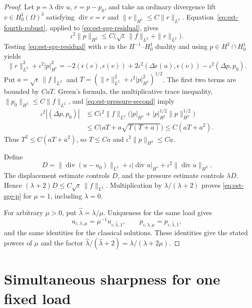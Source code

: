 \documentclass[11pt,a4paper]{article}
\theoremstyle{remark}
\numberwithin{equation}{section}
\begin{document}
\begin{proof}
Let $p=\lambda\operatorname{div}u$, $r=p-p_0$, and take an ordinary
divergence lift $v\in H_0^1(\Omega)^3$ satisfying
$\operatorname{div}v=r$ and $\|v\|_{H^1}\le C\|r\|_{L^2}$.
Equation~\eqref{eq:est-fourth-robust}, applied to
\eqref{eq:est-sge-residual}, gives
\begin{equation}\label{eq:est-pressure-second}
 \iota^2\|p\|_{H^2}
 \le C\bigl(\sqrt\iota\,\|f\|_{L^2}+\|r\|_{L^2}\bigr).
\end{equation}
Testing \eqref{eq:est-sge-residual} with $v$ in the $H^{-1}$--$H_0^1$
duality and using $p\in H^2\cap H_0^1$ yields
\begin{equation}\label{eq:est-pressure-identity}
 \|r\|_{L^2}^2+\iota^2|p|_{H^1}^2
 =-2(\epsilon(e),\epsilon(v))
       +2\iota^2(\Delta\epsilon(u),\epsilon(v))
       -\iota^2(\Delta p,p_0).
\end{equation}
Put $a=\sqrt\iota\,\|f\|_{L^2}$ and
$T=(\|r\|_{L^2}^2+\iota^2|p|_{H^1}^2)^{1/2}$.
The first two terms are bounded by $CaT$.
Green's formula, the multiplicative trace inequality,
$\|p_0\|_{H^1}\le C\|f\|_{L^2}$, and
\eqref{eq:est-pressure-second} imply
\begin{align*}
 \iota^2|(\Delta p,p_0)|
 &\le C\iota^2\|f\|_{L^2}
          \bigl(|p|_{H^1}+|p|_{H^1}^{1/2}\|p\|_{H^2}^{1/2}\bigr)\\
 &\le C\bigl(aT+a\sqrt{T(T+a)}\bigr)
 \le C(aT+a^2).
\end{align*}
Thus $T^2\le C(aT+a^2)$, so $T\le Ca$ and
$\iota^2\|p\|_{H^2}\le Ca$.

Define
\[
 D=\|\operatorname{div}(u-u_0)\|_{L^2}
       +\iota|\operatorname{div}u|_{H^1}
       +\iota^2\|\operatorname{div}u\|_{H^2}.
\]
The displacement estimate controls $D$, and the pressure estimate
controls $\lambda D$. Hence
$(\lambda+2)D\le C\sqrt\iota\,\|f\|_{L^2}$.
Multiplication by $\lambda/(\lambda+2)$ proves
\eqref{eq:est-sge-p} for $\mu=1$, including $\lambda=0$.

For arbitrary $\mu>0$, put $\widehat\lambda=\lambda/\mu$.
Uniqueness for the same load gives
\[
 u_{\iota;\lambda,\mu}=\mu^{-1}u_{\iota;\widehat\lambda,1},
 \qquad p_{\iota;\lambda,\mu}=p_{\iota;\widehat\lambda,1},
\]
and the same identities for the classical solutions. These identities
give the stated powers of $\mu$ and the factor
$\widehat\lambda/(\widehat\lambda+2)=\lambda/(\lambda+2\mu)$.
\end{proof}

\section{Simultaneous sharpness for one fixed load}
\label{sec:est-sharpness}
\end{document}
